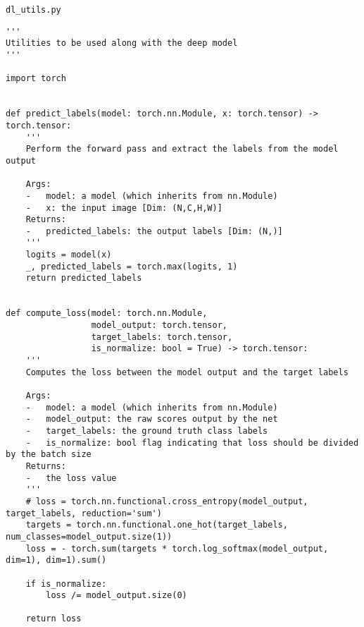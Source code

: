 \texttt{dl\_utils.py}
\begin{lstlisting}[style=Python]
'''
Utilities to be used along with the deep model
'''

import torch


def predict_labels(model: torch.nn.Module, x: torch.tensor) -> torch.tensor:
    '''
    Perform the forward pass and extract the labels from the model output

    Args:
    -   model: a model (which inherits from nn.Module)
    -   x: the input image [Dim: (N,C,H,W)]
    Returns:
    -   predicted_labels: the output labels [Dim: (N,)]
    '''
    logits = model(x)
    _, predicted_labels = torch.max(logits, 1)
    return predicted_labels


def compute_loss(model: torch.nn.Module,
                 model_output: torch.tensor,
                 target_labels: torch.tensor,
                 is_normalize: bool = True) -> torch.tensor:
    '''
    Computes the loss between the model output and the target labels

    Args:
    -   model: a model (which inherits from nn.Module)
    -   model_output: the raw scores output by the net
    -   target_labels: the ground truth class labels
    -   is_normalize: bool flag indicating that loss should be divided by the batch size
    Returns:
    -   the loss value
    '''
    # loss = torch.nn.functional.cross_entropy(model_output, target_labels, reduction='sum')
    targets = torch.nn.functional.one_hot(target_labels, num_classes=model_output.size(1))
    loss = - torch.sum(targets * torch.log_softmax(model_output, dim=1), dim=1).sum()

    if is_normalize:
        loss /= model_output.size(0)
    
    return loss
\end{lstlisting}

